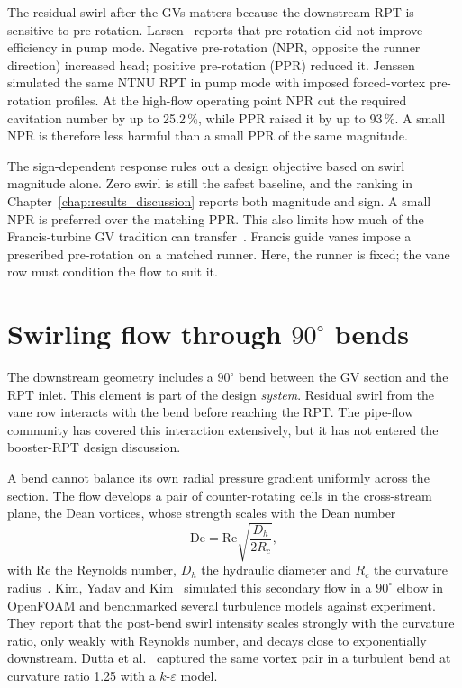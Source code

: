 The residual swirl after the GVs matters because the downstream RPT is sensitive to pre-rotation. Larsen~\cite{Larsen2019} reports that pre-rotation did not improve efficiency in pump mode. Negative pre-rotation (NPR, opposite the runner direction) increased head; positive pre-rotation (PPR) reduced it. Jenssen~\cite{Jenssen2020} simulated the same NTNU RPT in pump mode with imposed forced-vortex pre-rotation profiles. At the high-flow operating point NPR cut the required cavitation number by up to 25.2\,\%, while PPR raised it by up to 93\,\%. A small NPR is therefore less harmful than a small PPR of the same magnitude.
 
The sign-dependent response rules out a design objective based on swirl magnitude alone. Zero swirl is still the safest baseline, and the ranking in Chapter~\ref{chap:results_discussion} reports both magnitude and sign. A small NPR is preferred over the matching PPR. This also limits how much of the Francis-turbine GV tradition can transfer~\cite{Brekke2003, Brekke2001}. Francis guide vanes impose a prescribed pre-rotation on a matched runner. Here, the runner is fixed; the vane row must condition the flow to suit it.
 
\section{Swirling flow through $90^\circ$ bends}
\label{sec:lit_bend}
 
The downstream geometry includes a $90^\circ$ bend between the GV section and the RPT inlet. This element is part of the design \emph{system}. Residual swirl from the vane row interacts with the bend before reaching the RPT. The pipe-flow community has covered this interaction extensively, but it has not entered the booster-RPT design discussion.
 
A bend cannot balance its own radial pressure gradient uniformly across the section. The flow develops a pair of counter-rotating cells in the cross-stream plane, the Dean vortices, whose strength scales with the Dean number
\[\mathrm{De} = \mathrm{Re}\sqrt{\frac{D_h}{2R_c}},\]
with $\mathrm{Re}$ the Reynolds number, $D_h$ the hydraulic diameter and $R_c$ the curvature radius~\cite{Dean1927}. Kim, Yadav and Kim~\cite{KimYadavKim2014} simulated this secondary flow in a $90^\circ$ elbow in OpenFOAM and benchmarked several turbulence models against experiment. They report that the post-bend swirl intensity scales strongly with the curvature ratio, only weakly with Reynolds number, and decays close to exponentially downstream. Dutta et al.~\cite{Dutta2025DeanVortex} captured the same vortex pair in a turbulent bend at curvature ratio 1.25 with a $k$-$\varepsilon$ model.
 

